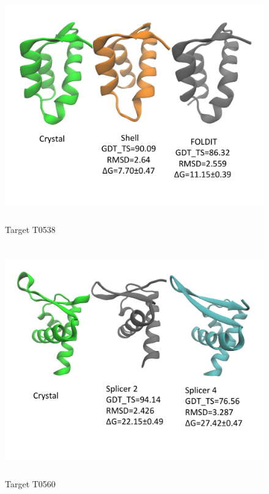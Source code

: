 \documentclass[12pt]{article}
\begin{document}
\begin{figure}
\begin{center}
\includegraphics[width=12cm,height=10cm]{T0538.pdf}
\end{center}
\caption{Target T0538}
\label{fig:T0538}
\end{figure}

\begin{figure}
\begin{center}
\includegraphics[width=12cm,height=10cm]{T0560.pdf}
\end{center}
\caption{Target T0560}
\label{fig:T0560}
\end{figure}
\end{document}
